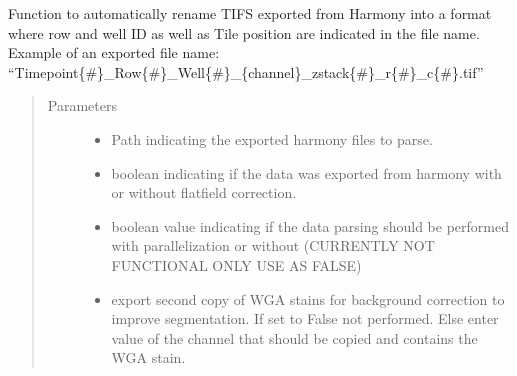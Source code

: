 \documentclass[a4paper,10pt,english,openany,oneside]{sphinxmanual}
\begin{document}
\begin{fulllineitems}
\label{\detokenize{pages/modules:vipertools.parse.parse_phenix}}
\sphinxAtStartPar
Function to automatically rename TIFS exported from Harmony into a format where row and well ID as well as Tile position are indicated in the file name.
Example of an exported file name: “Timepoint\{\#\}\_Row\{\#\}\_Well\{\#\}\_\{channel\}\_zstack\{\#\}\_r\{\#\}\_c\{\#\}.tif”
\begin{quote}\begin{description}
\item[{Parameters}] \leavevmode\begin{itemize}
\item {} 
\sphinxAtStartPar
{} \textendash{} Path indicating the exported harmony files to parse.

\item {} 
\sphinxAtStartPar
{} \textendash{} boolean indicating if the data was exported from harmony with or without flatfield correction.

\item {} 
\sphinxAtStartPar
{} \textendash{} boolean value indicating if the data parsing should be performed with parallelization or without (CURRENTLY NOT FUNCTIONAL ONLY USE AS FALSE)

\item {} 
\sphinxAtStartPar
{} \textendash{} export second copy of WGA stains for background correction to improve segmentation. If set to False not performed. Else enter value of the channel
that should be copied and contains the WGA stain.

\end{itemize}

\end{description}\end{quote}

\end{fulllineitems}
\end{document}
